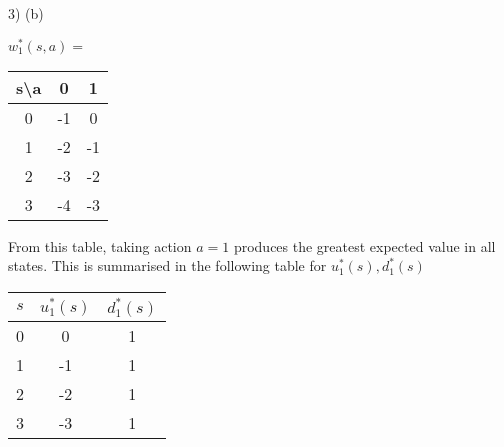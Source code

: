 \documentclass[11pt,a4paper]{article}
\begin{document}
\begin{answer}{3) (b)}
\begin{itemize}
    \begin{center}
      $w_1^*(s,a)=$
      \begin{tabular}{c|cc}
        s\textbackslash a&0&1\\\hline
        0&-1&0\\
        1&-2&-1\\
        2&-3&-2\\
        3&-4&-3
      \end{tabular}
    \end{center}
    From this table, taking action $a=1$ produces the greatest expected value in all states. This is summarised in the following table for $u_1^*(s),d_1^*(s)$
    \begin{center}
      \begin{tabular}{c|c|c}
        $s$&$u_1^*(s)$&$d_1^*(s)$\\\hline
        0&0&1\\
        1&-1&1\\
        2&-2&1\\
        3&-3&1
      \end{tabular}
    \end{center}


\end{itemize}
\end{answer}
\end{document}
